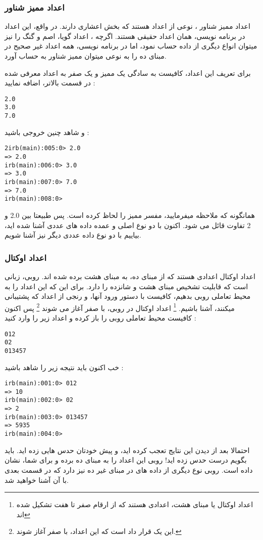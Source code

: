\documentclass[11pt]{article}
\begin{document}
\subsubsection{اعداد ممیز شناور}
اعداد ممیز شناور
، نوعی از اعداد هستند که بخش اعشاری دارند. در واقع، این اعداد در برنامه نویسی، همان اعداد حقیقی هستند. اگرچه ، اعداد گویا، اصم و گنگ را نیز میتوان انواع دیگری از داده حساب نمود، اما در برنامه نویسی، همه اعداد غیر صحیح در مبنای ده را به نوعی میتوان ممیز شناور به حساب آورد. 

برای تعریف این اعداد، کافیست به سادگی یک ممیز و یک صفر به اعداد معرفی شده در قسمت بالاتر، اضافه نمایید :

\begin{latin}
\begin{verbatim}
2.0
3.0
7.0
\end{verbatim}
\end{latin}
و شاهد چنین خروجی باشید :
\begin{latin}
\begin{verbatim}
2irb(main):005:0> 2.0
=> 2.0
irb(main):006:0> 3.0
=> 3.0
irb(main):007:0> 7.0
=> 7.0
irb(main):008:0> 
\end{verbatim}
\end{latin}
همانگونه که ملاحظه میفرمایید، مفسر ممیز را لحاظ کرده است. پس طبیعتا بین 2.0 و 2 تفاوت قائل می شود. اکنون با دو نوع اصلی و عمده داده های عددی آشنا شده اید، بیاییم با دو نوع داده عددی دیگر نیز آشنا شویم. 
\subsubsection{اعداد اوکتال}
اعداد اوکتال
اعدادی هستند که از مبنای ده، به مبنای هشت برده شده اند. روبی، زبانی است که قابلیت تشخیص مبنای هشت و شانزده را دارد. برای این که این اعداد را به محیط تعاملی روبی بدهیم، کافیست با دستور ورود آنها، و رنجی از اعداد که پشتیبانی میکنند، آشنا باشیم.
\footnote{اعداد اوکتال یا مبنای هشت، اعدادی هستند که از ارقام صفر تا هفت تشکیل شده اند}
اعداد اوکتال در روبی، با صفر آغاز می شوند
\footnote{این یک قرار داد است که این اعداد، با صفر آغاز شوند.}
پس اکنون کافیست محیط تعاملی روبی را باز کرده و اعداد زیر را وارد کنید :

\begin{latin}
\begin{verbatim}
012
02
013457
\end{verbatim}
\end{latin}
خب اکنون باید نتیجه زیر را شاهد باشید :
\begin{latin}
\begin{verbatim}
irb(main):001:0> 012
=> 10
irb(main):002:0> 02
=> 2
irb(main):003:0> 013457
=> 5935
irb(main):004:0>
\end{verbatim}
\end{latin}
احتمالا بعد از دیدن این نتایج تعجب کرده اید، و پیش خودتان حدس هایی زده اید. باید بگویم درست حدس زده اید! روبی این اعداد را به مبنای ده برده و برای شما، نشان داده است. روبی نوع دیگری از داده های در مبنای غیر ده نیز دارد که در قسمت بعدی با آن آشنا خواهید شد. 
\end{document}
